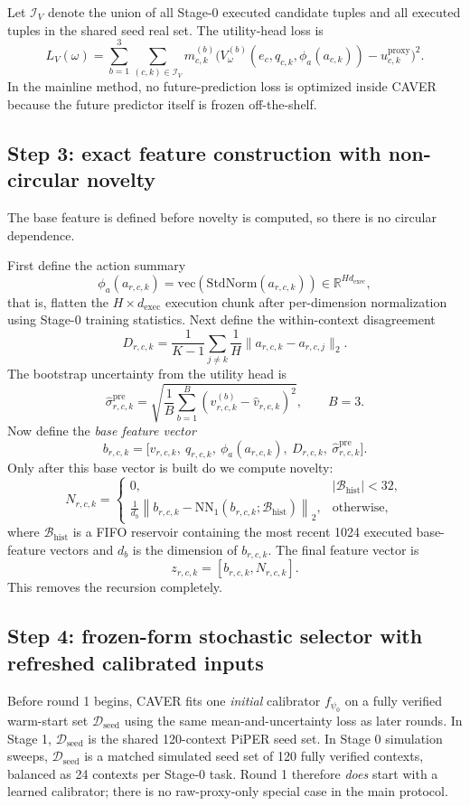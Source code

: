 \documentclass[10pt]{article}
\theoremstyle{plain}
\theoremstyle{definition}
\theoremstyle{remark}
\begin{document}
Let $\mathcal I_V$ denote the union of all Stage-0 executed candidate tuples and all executed tuples in the shared seed real set. The utility-head loss is
\[
L_V(\omega)=\sum_{b=1}^{3}\sum_{(c,k)\in\mathcal I_V}m^{(b)}_{c,k}\Big(V_{\omega}^{(b)}(e_c,q_{c,k},\phi_a(a_{c,k}))-u^{\mathrm{proxy}}_{c,k}\Big)^2.
\]
In the mainline method, no future-prediction loss is optimized inside CAVER because the future predictor itself is frozen off-the-shelf.

\subsection{Step 3: exact feature construction with non-circular novelty}
The base feature is defined before novelty is computed, so there is no circular dependence.

First define the action summary
\[
\phi_a(a_{r,c,k})=\mathrm{vec}(\mathrm{StdNorm}(a_{r,c,k}))\in\mathbb R^{Hd_{\mathrm{exec}}},
\]
that is, flatten the $H\times d_{\mathrm{exec}}$ execution chunk after per-dimension normalization using Stage-0 training statistics. Next define the within-context disagreement
\[
D_{r,c,k}=\frac{1}{K-1}\sum_{j\neq k}\frac{1}{H}\lVert a_{r,c,k}-a_{r,c,j}\rVert_2.
\]
The bootstrap uncertainty from the utility head is
\[
\hat\sigma^{\mathrm{pre}}_{r,c,k}=\sqrt{\frac{1}{B}\sum_{b=1}^{B}(\hat v^{(b)}_{r,c,k}-\hat v_{r,c,k})^2},\qquad B=3.
\]
Now define the \emph{base feature vector}
\[
b_{r,c,k}=\big[\hat v_{r,c,k},\ q_{r,c,k},\ \phi_a(a_{r,c,k}),\ D_{r,c,k},\ \hat\sigma^{\mathrm{pre}}_{r,c,k}\big].
\]
Only after this base vector is built do we compute novelty:
\[
N_{r,c,k}=\begin{cases}
0, & |\mathcal B_{\mathrm{hist}}|<32,\\[0.4em]
\frac{1}{d_b}\left\|b_{r,c,k}-\mathrm{NN}_1(b_{r,c,k};\mathcal B_{\mathrm{hist}})\right\|_2, & \text{otherwise,}
\end{cases}
\]
where $\mathcal B_{\mathrm{hist}}$ is a FIFO reservoir containing the most recent 1024 executed base-feature vectors and $d_b$ is the dimension of $b_{r,c,k}$. The final feature vector is
\[
z_{r,c,k}=[b_{r,c,k},N_{r,c,k}].
\]
This removes the recursion completely.

\subsection{Step 4: frozen-form stochastic selector with refreshed calibrated inputs}
Before round 1 begins, CAVER fits one \emph{initial} calibrator $f_{\psi_0}$ on a fully verified warm-start set $\mathcal D_{\mathrm{seed}}$ using the same mean-and-uncertainty loss as later rounds. In Stage 1, $\mathcal D_{\mathrm{seed}}$ is the shared 120-context PiPER seed set. In Stage 0 simulation sweeps, $\mathcal D_{\mathrm{seed}}$ is a matched simulated seed set of 120 fully verified contexts, balanced as 24 contexts per Stage-0 task. Round 1 therefore \emph{does} start with a learned calibrator; there is no raw-proxy-only special case in the main protocol.
\end{document}
